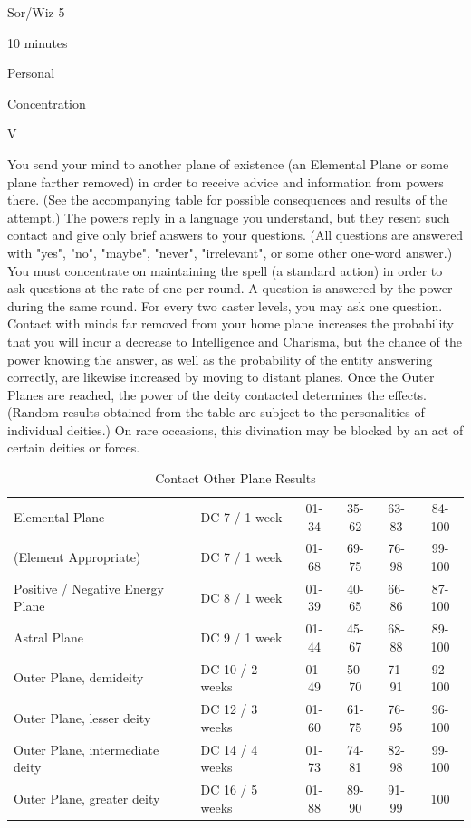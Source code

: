 
\begin{description*}
\item[Level:] Sor/Wiz 5
\item[Casting Time:] 10 minutes
\item[Range:] Personal
\item[Duration:] Concentration
\item[Components:] V
\end{description*}

You send your mind to another plane of existence (an Elemental Plane or some plane
farther removed) in order to receive advice and information from powers there.
(See the accompanying table for possible consequences and results of the attempt.)
The powers reply in a language you understand, but they resent such contact and
give only brief answers to your questions. (All questions are answered with "yes",
"no", "maybe", "never", "irrelevant", or some other one-word answer.)
You must concentrate on maintaining the spell (a standard action) in order to ask
questions at the rate of one per round. A question is answered by the power during
the same round. For every two caster levels, you may ask one question.
Contact with minds far removed from your home plane increases the probability that
you will incur a decrease to Intelligence and Charisma, but the chance of the power
knowing the answer, as well as the probability of the entity answering correctly,
are likewise increased by moving to distant planes.
Once the Outer Planes are reached, the power of the deity contacted determines
the effects. (Random results obtained from the table are subject to the personalities
of individual deities.)
On rare occasions, this divination may be blocked by an act of certain deities
or forces.
\begin{table}[htb]
\caption{Contact Other Plane Results}
\centering
\begin{tabular}{l l cccc}
Elemental Plane & DC 7 / 1 week & 01-34 & 35-62 & 63-83 & 84-100\\
(Element Appropriate) & DC 7 / 1 week & 01-68 & 69-75 & 76-98 & 99-100\\
Positive / Negative Energy Plane & DC 8 / 1 week & 01-39 & 40-65 & 66-86 & 87-100\\
Astral Plane & DC 9 / 1 week & 01-44 & 45-67 & 68-88 & 89-100\\
Outer Plane, demideity & DC 10 / 2 weeks & 01-49 & 50-70 & 71-91 & 92-100\\
Outer Plane, lesser deity & DC 12 / 3 weeks & 01-60 & 61-75 & 76-95 & 96-100\\
Outer Plane, intermediate deity & DC 14 / 4 weeks & 01-73 & 74-81 & 82-98 & 99-100\\
Outer Plane, greater deity & DC 16 / 5 weeks & 01-88 & 89-90 & 91-99 & 100\\
\end{tabular}
\end{table}
